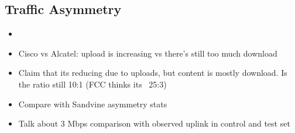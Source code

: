 

\subsection{Traffic Asymmetry}
\label{subsec:asymmetry}

\begin{itemize}
\itemsep0em 
\item {}
\item Cisco vs Alcatel: upload is increasing vs there's still too much download
\item Claim that its reducing due to uploads, but content is mostly download. Is the ratio still 10:1 (FCC thinks its ~25:3)
\item Compare with Sandvine asymmetry stats
\item Talk about 3 Mbps comparison with observed uplink in control and test set
\end{itemize}



